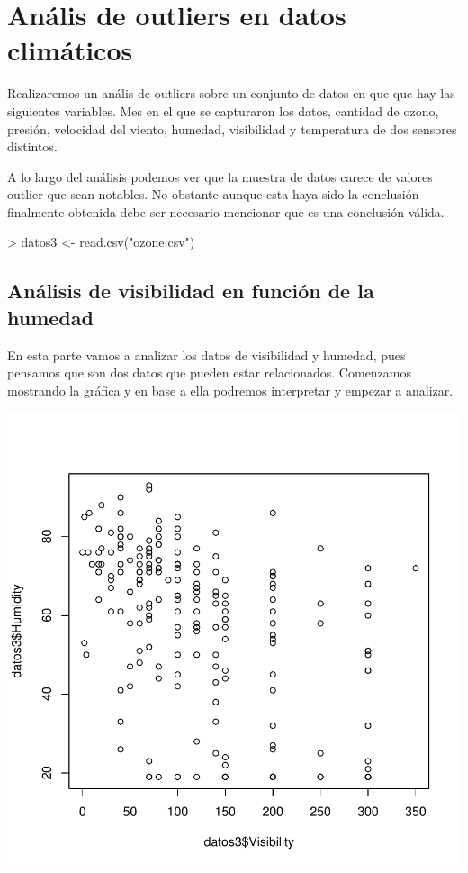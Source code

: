 \documentclass [a4paper] {article}
\begin{document}
\newpage
\section{Anális de outliers en datos climáticos}

Realizaremos un anális de outliers sobre un conjunto de datos en que que hay las siguientes variables.
Mes en el que se capturaron los datos, cantidad de ozono, presión, velocidad del viento, humedad, visibilidad y temperatura de dos sensores distintos.

A lo largo del análisis podemos ver que la muestra de datos carece de valores outlier que sean notables.
No obstante aunque esta haya sido la conclusión finalmente obtenida debe ser necesario mencionar que es una conclusión válida.

\begin{Schunk}
\begin{Sinput}
> datos3 <- read.csv("ozone.csv")
\end{Sinput}
\end{Schunk}


\subsection{Análisis de visibilidad en función de la humedad}
En esta parte vamos a analizar los datos de visibilidad y humedad, pues pensamos que son dos datos que pueden estar relacionados. Comenzamos mostrando 
la gráfica y en base a ella podremos interpretar y empezar a analizar.

\begin{center}
\includegraphics{entrega-datvishum_plot}
\end{center}
\end{document}
